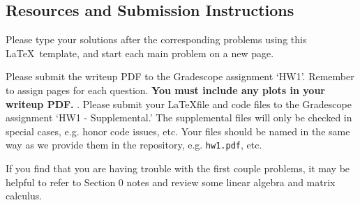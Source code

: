 \documentclass[submit]{../harvardml}
\begin{document}
\subsection*{Resources and Submission Instructions}



Please type your solutions after the corresponding problems using this \LaTeX\ template, and start each main problem on a new page.

Please submit the writeup PDF to the Gradescope assignment `HW1'. Remember to assign pages for each question.  \textbf{You must include any plots in your writeup PDF. }. Please submit your \LaTeX file and code files to the Gradescope assignment `HW1 - Supplemental.' The supplemental files will only be checked in special cases, e.g. honor code issues, etc. Your files should be named in the same way as we provide them in the repository, e.g. \texttt{hw1.pdf}, etc.

If you find that you are having trouble with the first couple problems, it may be helpful to refer to Section 0 notes and review some linear algebra and matrix calculus. 

\newpage 
\end{document}
